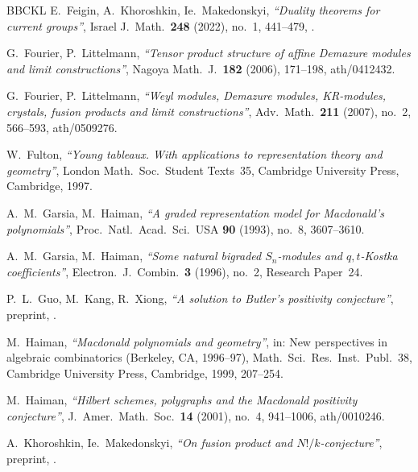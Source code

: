 \documentclass[11pt]{amsart}
\makeatletter
\newcommand\btitle[1]{\textit{``#1''}}
\newcommand\eprint[1]{\@eprint#1\@nil}            %
\def\@eprint#1:#2\@nil{\href{https://arxiv.org/abs/#2}{arXiv:#2}}
\numberwithin{equation}{section}
\theoremstyle{definition}
\makeatother
\begin{document}
\begin{thebibliography}{BBCKL}
		 E.~Feigin, A.~Khoroshkin, Ie.~Makedonskyi, \btitle{Duality theorems for current groups}, Israel J.\ Math.\ \textbf{248} (2022), no.~1, 441--479, \eprint{arXiv:1906.03290}.


		 G.~Fourier, P.~Littelmann, \btitle{Tensor product structure of affine Demazure modules and limit constructions}, Nagoya Math.\ J.\ \textbf{182} (2006), 171--198, \eprint{arXiv:math/0412432}.

		 G.~Fourier, P.~Littelmann, \btitle{Weyl modules, Demazure modules, KR-modules, crystals, fusion products and limit constructions}, Adv.\ Math.\ \textbf{211} (2007), no.~2, 566--593, \eprint{arXiv:math/0509276}.

		 W.~Fulton, \btitle{Young tableaux. With applications to representation theory and geometry}, London Math.\ Soc.\ Student Texts~35, Cambridge University Press, Cambridge, 1997.

		 A.~M.~Garsia, M.~Haiman, \btitle{A graded representation model for Macdonald's polynomials}, Proc.\ Natl.\ Acad.\ Sci.\ USA \textbf{90} (1993), no.~8, 3607--3610.

		 A.~M.~Garsia, M.~Haiman, \btitle{Some natural bigraded $S_n$-modules and $q,t$-Kostka coefficients}, Electron.\ J.\ Combin.\ \textbf{3} (1996), no.~2, Research Paper~24.

		 P.~L.~Guo, M.~Kang, R.~Xiong, \btitle{A solution to Butler's positivity conjecture}, preprint, \eprint{arXiv:2608.11543}.

		 M.~Haiman, \btitle{Macdonald polynomials and geometry}, in: New perspectives in algebraic combinatorics (Berkeley, CA, 1996--97), Math.\ Sci.\ Res.\ Inst.\ Publ.~38, Cambridge University Press, Cambridge, 1999, 207--254.

		 M.~Haiman, \btitle{Hilbert schemes, polygraphs and the Macdonald positivity conjecture}, J.\ Amer.\ Math.\ Soc.\ \textbf{14} (2001), no.~4, 941--1006, \eprint{arXiv:math/0010246}.

		 A.~Khoroshkin, Ie.~Makedonskyi, \btitle{On fusion product and $N!/k$-conjecture}, preprint, \eprint{arXiv:2610.07461}.


\end{thebibliography}
\end{document}
